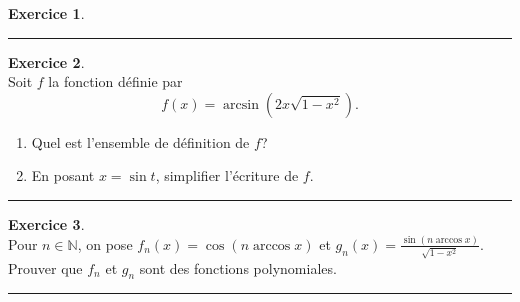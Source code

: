 \documentclass[a4paper,11pt]{article}
\theoremstyle{definition}
\newtheorem{exo}{Exercice} %
\begin{document}
\begin{minipage}{1\linewidth}
\begin{minipage}[t]{0.48\linewidth}
\begin{exo}
		\centering
		\rule{1\linewidth}{0.6pt}
	\end{exo}
	
	
	
	\begin{exo}\textit{}\quad\\
		Soit $f$ la fonction définie par 
		$$f(x)=\arcsin\left(2x\sqrt{1-x^2}\right).$$
		\begin{enumerate}
			\item Quel est l'ensemble de définition de $f$?
			\item En posant $x=\sin t$, simplifier l'écriture de $f$.
		\end{enumerate}
		
		\centering
		\rule{1\linewidth}{0.6pt}
	\end{exo}
	
\begin{exo}\quad\\
	Pour $n\in\mathbb N$, on pose $f_n(x)=\cos(n\arccos x)$ et $g_n(x)=\frac{\sin(n \arccos x)}{\sqrt{1-x^2}}$.
	Prouver que $f_n$ et $g_n$ sont des fonctions polynomiales.
	
	\centering
	\rule{1\linewidth}{0.6pt}
\end{exo}
		
		
		
		
	\end{minipage}
\end{minipage}



		
	
		
		
\end{document}
